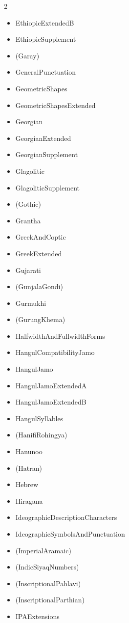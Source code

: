 \documentclass{article}
\newenvironment{itemlist}{%
  \begin{itemize}
  \setlength{\itemsep}{0pt}
  \setlength{\parsep}{0pt}
  \setlength{\topsep}{0pt}
  \setlength{\partopsep}{0pt}
  \setlength{\parskip}{0pt}
  \setlength{\labelsep}{5pt}}%
{
  \end{itemize}}
\begin{document}
\begin{multicols*}{2}
\begin{itemlist}
        \item EthiopicExtendedB
        \item EthiopicSupplement
        \item (Garay)
        \item GeneralPunctuation
        \item GeometricShapes
        \item GeometricShapesExtended
        \item Georgian
        \item GeorgianExtended
        \item GeorgianSupplement
        \item Glagolitic
        \item GlagoliticSupplement
        \item (Gothic)
        \item Grantha
        \item GreekAndCoptic
        \item GreekExtended
        \item Gujarati
        \item (GunjalaGondi)
        \item Gurmukhi
        \item (GurungKhema)
        \item HalfwidthAndFullwidthForms
        \item HangulCompatibilityJamo
        \item HangulJamo
        \item HangulJamoExtendedA
        \item HangulJamoExtendedB
        \item HangulSyllables
        \item (HanifiRohingya)
        \item Hanunoo
        \item (Hatran)
        \item Hebrew
        \item Hiragana
        \item IdeographicDescriptionCharacters
        \item IdeographicSymbolsAndPunctuation
        \item (ImperialAramaic)
        \item (IndicSiyaqNumbers)
        \item (InscriptionalPahlavi)
        \item (InscriptionalParthian)
        \item IPAExtensions

\end{itemlist}
\end{multicols*}
\end{document}
